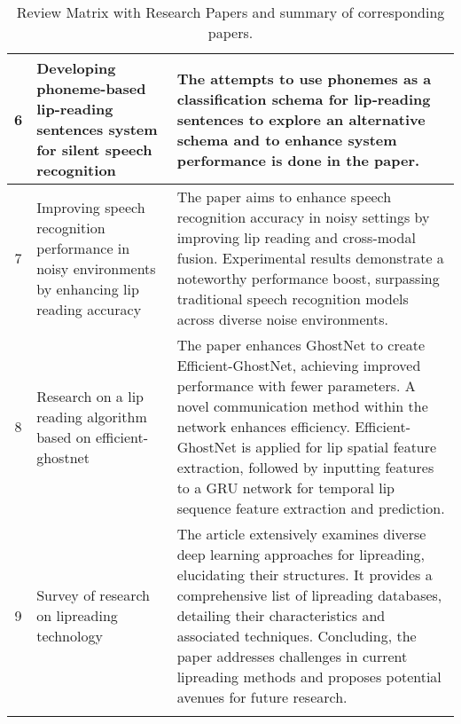 \begin{flushleft}
\begin{longtable}{ |c|p{5cm}|p{7.5cm}| }
        6 & Developing phoneme-based lip-reading sentences system for silent speech recognition \cite{el2023developing} & The attempts to use phonemes as a classification schema for lip‐reading sentences to explore an alternative schema and to enhance system performance is done in the paper.\\
        \hline
        7 & Improving speech recognition performance in noisy environments by enhancing lip reading accuracy \cite{li2023improving} & The paper aims to enhance speech recognition accuracy in noisy settings by improving lip reading and cross-modal fusion. Experimental results demonstrate a noteworthy performance boost, surpassing traditional speech recognition models across diverse noise environments.\\
        \hline
        8 & Research on a lip reading algorithm based on efficient-ghostnet \cite{zhang2023research} & The paper enhances GhostNet to create Efficient-GhostNet, achieving improved performance with fewer parameters. A novel communication method within the network enhances efficiency. Efficient-GhostNet is applied for lip spatial feature extraction, followed by inputting features to a GRU network for temporal lip sequence feature extraction and prediction. \\
        \hline
        9 & Survey of research on lipreading technology \cite{hao2020survey} &The article extensively examines diverse deep learning approaches for lipreading, elucidating their structures. It provides a comprehensive list of lipreading databases, detailing their characteristics and associated techniques. Concluding, the paper addresses challenges in current lipreading methods and proposes potential avenues for future research. \\
        \hline
        \caption{Review Matrix with Research Papers and summary of corresponding papers.}
    \end{longtable}
\end{flushleft}

